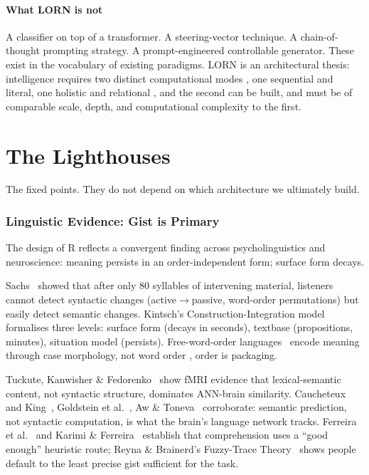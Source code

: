 \documentclass[10pt, twocolumn, a4paper]{article}
\begin{document}
\subsection*{What LORN is not}

A classifier on top of a transformer. A steering-vector technique. A chain-of-thought prompting strategy. A prompt-engineered controllable generator. These exist in the vocabulary of existing paradigms. LORN is an architectural thesis: intelligence requires two distinct computational modes ,  one sequential and literal, one holistic and relational ,  and the second can be built, and must be of comparable scale, depth, and computational complexity to the first.


\part{The Lighthouses}

The fixed points. They do not depend on which architecture we ultimately build.

\section{Linguistic Evidence: Gist is Primary}

The design of R reflects a convergent finding across psycholinguistics and neuroscience: meaning persists in an order-independent form; surface form decays.

Sachs~\cite{sachs1967} showed that after only 80 syllables of intervening material, listeners cannot detect syntactic changes (active$\to$passive, word-order permutations) but easily detect semantic changes. Kintsch's Construction-Integration model~\cite{kintsch1988} formalises three levels: surface form (decays in seconds), textbase (propositions, minutes), situation model (persists). Free-word-order languages~\cite{hale1983,lambrecht1994} encode meaning through case morphology, not word order ,  order is packaging.

Tuckute, Kanwisher \& Fedorenko~\cite{tuckute2024} show fMRI evidence that lexical-semantic content, not syntactic structure, dominates ANN-brain similarity. Caucheteux and King~\cite{caucheteux2022}, Goldstein et al.~\cite{goldstein2022}, Aw \& Toneva~\cite{aw-toneva2024} corroborate: semantic prediction, not syntactic computation, is what the brain's language network tracks. Ferreira et al.~\cite{ferreira2002} and Karimi \& Ferreira~\cite{karimi-ferreira2024} establish that comprehension uses a ``good enough'' heuristic route; Reyna \& Brainerd's Fuzzy-Trace Theory~\cite{reyna-brainerd2020} shows people default to the least precise gist sufficient for the task.
\end{document}
